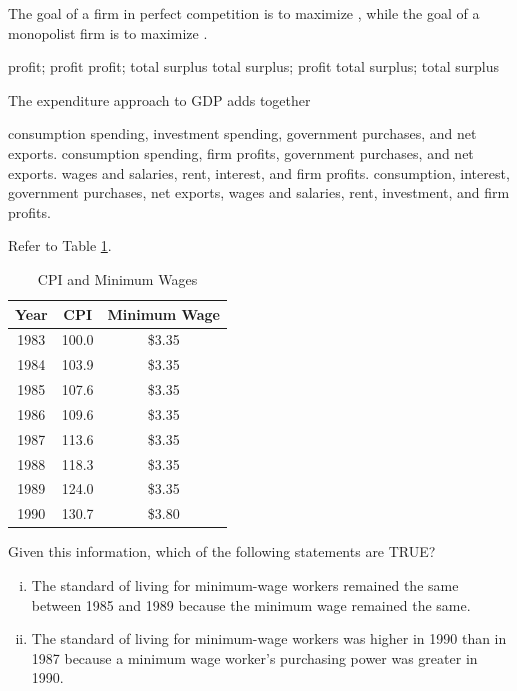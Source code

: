 \documentclass[addpoints,11pt]{exam}
\theoremstyle{definition}
\newcommand{\blank}[0]{\underline{\hspace{3cm}}}
\begin{document}
\begin{questions}
\question The goal of a firm in perfect competition is to maximize \blank, while the goal of a monopolist firm is to maximize \blank.

\begin{choices}
	\CorrectChoice profit; profit
	\choice profit; total surplus
	\choice total surplus; profit
	\choice total surplus; total surplus
\end{choices}

\question The expenditure approach to GDP adds together

\begin{choices}
	\CorrectChoice consumption spending, investment spending, government purchases, and net exports.
	\choice consumption spending, firm profits, government purchases, and net exports.
	\choice wages and salaries, rent, interest, and firm profits.
	\choice consumption, interest, government purchases, net exports, wages and salaries, rent, investment, and firm profits.
\end{choices}

\newpage

	\question Refer to Table \ref{tab2}. 

\begin{table}[H]
	\centering
	\caption{CPI and Minimum Wages}
	\label{tab2}
	\begin{tabular}{c|c|c}        
		
		Year & CPI & Minimum Wage \\
		\hline
		1983 & 100.0 & \$3.35 \\
		1984 & 103.9 & \$3.35 \\
		1985 & 107.6 & \$3.35 \\
		1986 & 109.6 & \$3.35 \\
		1987 & 113.6 & \$3.35 \\
		1988 & 118.3 & \$3.35 \\
		1989 & 124.0 & \$3.35 \\
		1990 & 130.7 & \$3.80 \\
	\end{tabular}
\end{table}

Given this information, which of the following statements are TRUE?

\begin{enumerate}[(i)]
	\item The standard of living for minimum-wage workers remained the same between 1985 and 1989 because the minimum wage remained the same.
	\item The standard of living for minimum-wage workers was higher in 1990 than in 1987 because a minimum wage worker's purchasing power was greater in 1990.
\end{enumerate}


\end{questions}
\end{document}
